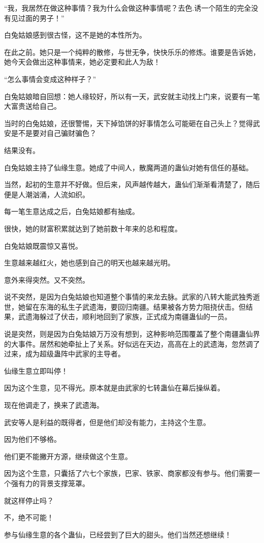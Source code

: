 \begin{this_body}
“我，我居然在做这种事情？我为什么会做这种事情呢？去色.诱一个陌生的完全没有见过面的男子！”

白兔姑娘感到很古怪，这不是她的本性所为。

在此之前。她只是一个纯粹的散修，与世无争，快快乐乐的修炼。谁要是告诉她，她今天会做出这种事情来，她必定要和此人为敌！

“怎么事情会变成这种样子？”

白兔姑娘暗自回想：她人缘较好，所以有一天，武安就主动找上门来，说要有一笔大富贵送给自己。

当时的白兔姑娘，还很警惕，天下掉馅饼的好事情怎么可能砸在自己头上？觉得武安是不是要对自己骗财骗色？

结果没有。

白兔姑娘主持了仙缘生意。她成了中间人，散魔两道的蛊仙对她有信任的基础。

当然，起初的生意并不好做。但后来，风声越传越大，蛊仙们渐渐看清楚了，随后便是人潮汹涌，人流如织。

每一笔生意达成之后，白兔姑娘都有抽成。

很快，她的财富积累就达到了她前数十年来的总和程度。

白兔姑娘既震惊又喜悦。

生意越来越红火，她也感到自己的明天也越来越光明。

意外来得突然。又不突然。

说不突然，是因为白兔姑娘也知道整个事情的来龙去脉。武家的八转大能武独秀逝世，她留在东海的私生子武遗海，要回归南疆。结果被各方势力阻挠伏击。但结果，武遗海躲过了伏击，顺利地回到了家族，正式成为南疆蛊仙的一员。

说是突然，则是因为白兔姑娘万万没有想到，这种影响范围覆盖了整个南疆蛊仙界的大事件。居然和她牵扯上了关系。好似远在天边，高高在上的武遗海，忽然调了过来，成为超级蛊阵中武家的主导者。

仙缘生意立即叫停！

因为这个生意，见不得光。原本就是由武家的七转蛊仙在幕后操纵着。

现在他调走了，换来了武遗海。

武安等人是利益的既得者，但是他们却没有能力，主持这个生意。

因为他们不够格。

他们更不能撇开方源，继续做这个生意。

因为这个生意，只囊括了六七个家族，巴家、铁家、商家都没有参与。他们需要一个强有力的背景支撑笼罩。

就这样停止吗？

不，绝不可能！

参与仙缘生意的各个蛊仙，已经尝到了巨大的甜头。他们当然还想继续！


\end{this_body}
